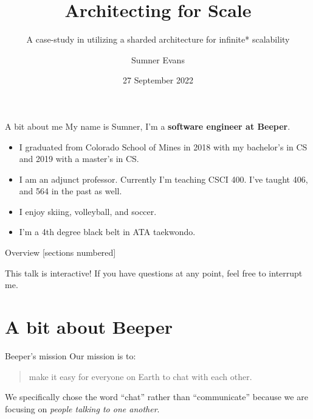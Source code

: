 \documentclass{beeper}
\title{Architecting for Scale}
\subtitle{A case-study in utilizing a sharded architecture for infinite* scalability}
\author{Sumner Evans}
\institute{Beeper}
\date{27 September 2022}
\begin{document}
\begin{frame}{A bit about me}
    My name is Sumner, I'm a \textbf{software engineer at Beeper}.
    \begin{itemize}
        \item I graduated from Colorado School of Mines in 2018 with my
            bachelor's in CS and 2019 with a master's in CS.
        \item I am an adjunct professor. Currently I'm teaching CSCI 400. I've
            taught 406, and 564 in the past as well.
        \item I enjoy skiing, volleyball, and soccer.
        \item I'm a 4th degree black belt in ATA taekwondo.
    \end{itemize}
\end{frame}

\begin{frame}{Overview}
    [sections numbered]
    \tableofcontents[hideallsubsections]

    \begin{block}{This talk is interactive!}
        If you have questions at any point, feel free to interrupt me.
    \end{block}
\end{frame}

\section{A bit about Beeper}

\begin{frame}{Beeper's mission}
    Our mission is to:\\

    \begin{quote}
        make it easy for everyone on Earth to chat with each other.
    \end{quote}
    \pause

    We specifically chose the word ``chat'' rather than ``communicate'' because
    we are focusing on \textit{people talking to one another}.
\end{frame}
\end{document}
